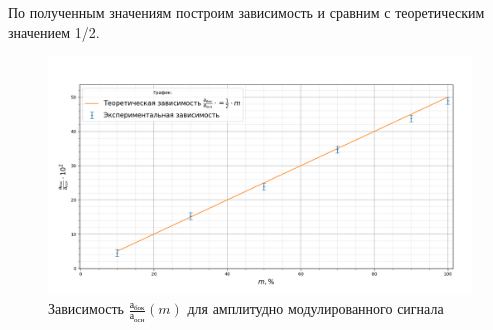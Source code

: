 \documentclass[a4paper, 12pt]{article}%
\begin{document}
 	По полученным значениям построим зависимость и сравним с теоретическим значением 1/2.
 	\begin{figure}[H]
 		\centering
 		\includegraphics[width=0.9\linewidth]{завис_3}
 		\caption{Зависимость $\frac{а_{бок}}{а_{осн}}(m)$ для амплитудно модулированного сигнала}
 		\label{fig:3}
 	\end{figure}
\end{document}
